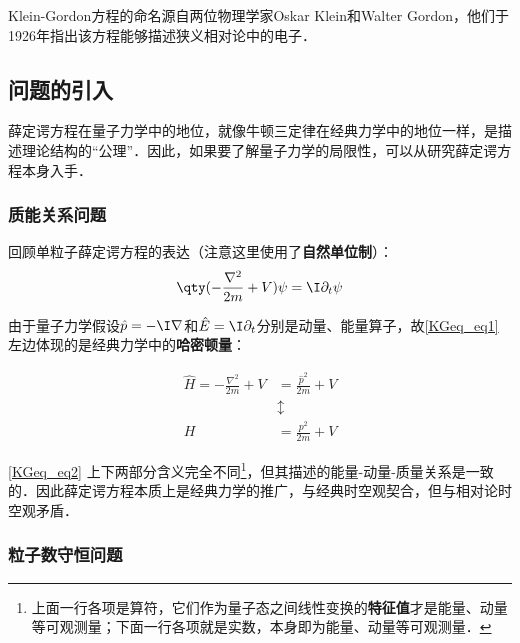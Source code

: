 


Klein-Gordon方程的命名源自两位物理学家Oskar Klein和Walter Gordon，他们于1926年指出该方程能够描述狭义相对论中的电子．


\subsection{问题的引入}

薛定谔方程在量子力学中的地位，就像牛顿三定律在经典力学中的地位一样，是描述理论结构的“公理”．因此，如果要了解量子力学的局限性，可以从研究薛定谔方程本身入手．

\subsubsection{质能关系问题}

回顾单粒子薛定谔方程的表达（注意这里使用了\textbf{自然单位制}）：
\begin{equation}\label{KGeq_eq1}
\qty(-\frac{\nabla^2}{2m}+V)\psi = \I \partial_t \psi
\end{equation}

由于量子力学假设$\hat{p}=-\I\nabla$和$\hat{E}=\I\partial_t$分别是动量、能量算子，故\autoref{KGeq_eq1} 左边体现的是经典力学中的\textbf{哈密顿量}：

\begin{equation}\label{KGeq_eq2}
\begin{aligned}
\hat{H}=-\frac{\nabla^2}{2m}+V &= \frac{\hat{p}^2}{2m}+V \\
&\updownarrow\\
H &= \frac{p^2}{2m}+V
\end{aligned}
\end{equation}

\autoref{KGeq_eq2} 上下两部分含义完全不同\footnote{上面一行各项是算符，它们作为量子态之间线性变换的\textbf{特征值}才是能量、动量等可观测量；下面一行各项就是实数，本身即为能量、动量等可观测量．}，但其描述的能量-动量-质量关系是一致的．因此薛定谔方程本质上是经典力学的推广，与经典时空观契合，但与相对论时空观矛盾．

\subsubsection{粒子数守恒问题}

